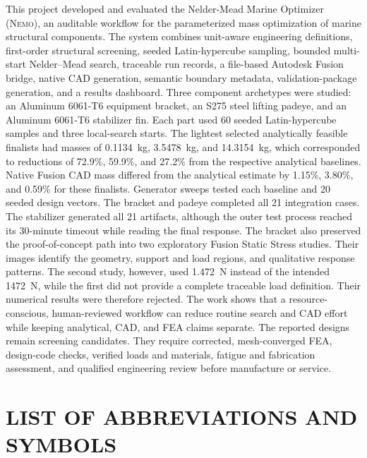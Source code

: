 \documentclass[12pt,a4paper]{report}
\newcommand{\NEMO}{\textsc{Nemo}}
\begin{document}
This project developed and evaluated the Nelder-Mead Marine Optimizer
(\NEMO), an auditable workflow for the parameterized mass optimization of
marine structural components. The system combines unit-aware engineering
definitions, first-order structural screening, seeded Latin-hypercube
sampling, bounded multi-start Nelder--Mead search, traceable run records, a
file-based Autodesk Fusion bridge, native CAD generation, semantic boundary
metadata, validation-package generation, and a results dashboard. Three
component archetypes were studied: an Aluminum 6061-T6 equipment bracket, an
S275 steel lifting padeye, and an Aluminum 6061-T6 stabilizer fin. Each part
used 60 seeded Latin-hypercube samples and three local-search starts. The
lightest selected analytically feasible finalists had masses of
0.1134~kg, 3.5478~kg, and 14.3154~kg, which corresponded to reductions of
72.9\%, 59.9\%, and 27.2\% from the respective analytical baselines. Native
Fusion CAD mass differed from the analytical estimate by 1.15\%, 3.80\%, and
0.59\% for these finalists. Generator sweeps tested each baseline and 20
seeded design vectors. The bracket and padeye completed all 21 integration
cases. The stabilizer generated all 21 artifacts, although the outer test
process reached its 30-minute timeout while reading the final response.
The bracket also preserved the proof-of-concept path into two exploratory
Fusion Static Stress studies. Their images identify the geometry, support and
load regions, and qualitative response patterns. The second study, however,
used 1.472~N instead of the intended 1472~N, while the first did not provide a
complete traceable load definition. Their numerical results were therefore
rejected. The work shows that a resource-conscious, human-reviewed workflow
can reduce routine search and CAD effort while keeping analytical, CAD, and
FEA claims separate. The reported designs remain screening candidates. They
require corrected, mesh-converged FEA, design-code checks, verified loads and
materials, fatigue and fabrication assessment, and qualified engineering
review before manufacture or service.

\clearpage
\tableofcontents
\clearpage
\listoffigures
\clearpage
\listoftables
\clearpage

\section*{LIST OF ABBREVIATIONS AND SYMBOLS}
\end{document}
